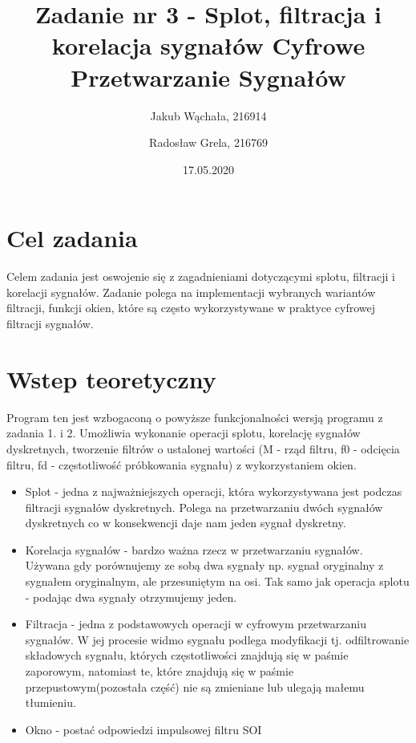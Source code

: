 \documentclass[12pt]{article}
\title{{\bf Zadanie nr 3 - Splot, filtracja i korelacja sygnałów}\linebreak
Cyfrowe Przetwarzanie Sygnałów}
\author{Jakub Wąchała, 216914 \and Radosław Grela, 216769}
\date{17.05.2020}
\begin{document}
\clearpage\maketitle
\thispagestyle{empty}
\newpage
\setcounter{page}{1}
\section{Cel zadania}
\label{cel}
Celem zadania jest oswojenie się z zagadnieniami dotyczącymi splotu, filtracji i korelacji sygnałów. Zadanie polega na implementacji wybranych wariantów filtracji, funkcji okien, które są często wykorzystywane w praktyce cyfrowej filtracji sygnałów. 

\section{Wstep teoretyczny}
Program ten jest wzbogaconą o powyższe funkcjonalności wersją programu z zadania 1. i 2. Umożliwia wykonanie operacji splotu, korelację sygnałów dyskretnych, tworzenie filtrów o ustalonej wartości (M - rząd filtru, f0 - odcięcia filtru, fd - częstotliwość próbkowania sygnału) z wykorzystaniem okien. 
\begin{itemize}
\item Splot - jedna z najważniejszych operacji, która wykorzystywana jest podczas filtracji sygnałów dyskretnych. Polega na przetwarzaniu dwóch sygnałów dyskretnych co w konsekwencji daje nam jeden sygnał dyskretny.
\item Korelacja sygnałów - bardzo ważna rzecz w przetwarzaniu sygnałów. Używana gdy porównujemy ze sobą dwa sygnały np. sygnał oryginalny z sygnałem oryginalnym, ale przesuniętym na osi. Tak samo jak operacja splotu - podając dwa sygnały otrzymujemy jeden.
\item Filtracja - jedna z podstawowych operacji w cyfrowym przetwarzaniu sygnałów. W jej procesie widmo sygnału podlega modyfikacji tj. odfiltrowanie składowych sygnału, których częstotliwości znajdują się w paśmie zaporowym, natomiast te, które znajdują się w paśmie przepustowym(pozostała część) nie są zmieniane lub ulegają małemu tłumieniu.
\item Okno - postać odpowiedzi impulsowej filtru SOI
\end{itemize}
\end{document}
